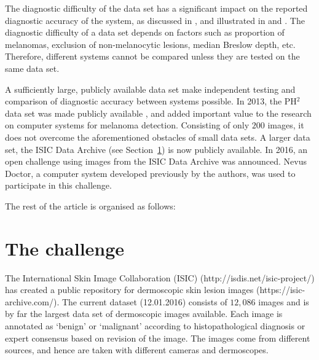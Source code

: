 \documentclass[a4paper,12pt]{article}
\begin{document}
The diagnostic difficulty of the data set has a significant impact on the reported diagnostic accuracy of the system, as discussed in \cite{Rosado2003Accuracy}, and illustrated in \cite{Malvehy2014Clinical} and \cite{Mollersen2015Computeraided}. 
The diagnostic difficulty of a data set depends on factors such as proportion of melanomas, exclusion of non-melanocytic lesions, median Breslow depth, etc. 
Therefore, different systems cannot be compared unless they are tested on the same data set. 

A sufficiently large, publicly available data set make independent testing and comparison of diagnostic accuracy between systems possible. 
In 2013, the PH$^2$ data set was made publicly available \citep{Mendonca2013PH2}, and added important value to the research on computer systems for melanoma detection. 
Consisting of only $200$ images, it does not overcome the aforementioned obstacles of small data sets. 
A larger data set, the ISIC Data Archive (see Section~\ref{sec:Challenge}) is now publicly available. 
In 2016, an open challenge using images from the ISIC Data Archive was announced. 
Nevus Doctor, a computer system developed previously by the authors, was used to participate in this challenge.

The rest of the article is organised as follows: %

\section{The challenge} \label{sec:Challenge}

The International Skin Image Collaboration (ISIC) (http://isdis.net/isic-project/) has created a public repository for dermoscopic skin lesion images (https://isic-archive.com/). 
The current dataset (12.01.2016) consists of $12,086$ images and is by far the largest data set of dermoscopic images available. 
Each image is annotated as `benign' or `malignant' according to histopathological diagnosis or expert consensus based on revision of the image. 
The images come from different sources, and hence are taken with different cameras and dermoscopes. 
\end{document}
